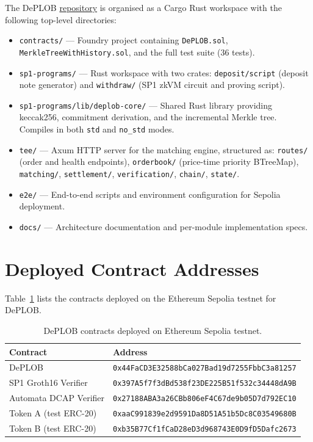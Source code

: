 \documentclass[12pt,a4paper]{article}
\begin{document}
The DePLOB \href{https://github.com/wr1159/deplob}{repository} is organised as a Cargo Rust workspace with the following top-level directories:

\begin{itemize}
    \item \texttt{contracts/} — Foundry project containing \texttt{DePLOB.sol}, \texttt{MerkleTreeWithHistory.sol}, and the full test suite (36 tests).
    \item \texttt{sp1-programs/} — Rust workspace with two crates: \texttt{deposit/script} (deposit note generator) and \texttt{withdraw/} (SP1 zkVM circuit and proving script).
    \item \texttt{sp1-programs/lib/deplob-core/} — Shared Rust library providing keccak256, commitment derivation, and the incremental Merkle tree. Compiles in both \texttt{std} and \texttt{no\_std} modes.
    \item \texttt{tee/} — Axum HTTP server for the matching engine, structured as: \texttt{routes/} (order and health endpoints), \texttt{orderbook/} (price-time priority BTreeMap), \texttt{matching/}, \texttt{settlement/}, \texttt{verification/}, \texttt{chain/}, \texttt{state/}.
    \item \texttt{e2e/} — End-to-end scripts and environment configuration for Sepolia deployment.
    \item \texttt{docs/} — Architecture documentation and per-module implementation specs.
\end{itemize}

\section{Deployed Contract Addresses}
\label{app:contracts}

Table~\ref{tab:contracts} lists the contracts deployed on the Ethereum Sepolia testnet for DePLOB.

\begin{table}[H]
\centering
\begin{tabular}{|l|l|}
\hline
\textbf{Contract} & \textbf{Address} \\
\hline
DePLOB & \texttt{0x44FaCD3E32588bCa027Bad19d7255FbbC3a81257} \\
\hline
SP1 Groth16 Verifier & \texttt{0x397A5f7f3dBd538f23DE225B51f532c34448dA9B} \\
\hline
Automata DCAP Verifier & \texttt{0x27188ABA3a26CBb806eF4C67de9b05D7d792EC10} \\
\hline
Token A (test ERC-20) & \texttt{0xaaC991839e2d9591Da8D51A51b5Dc8C03549680B} \\
\hline
Token B (test ERC-20) & \texttt{0xb35B77Cf1fCaD28eD3d968743E0D9fD5Dafc2673} \\
\hline
\end{tabular}
\caption{DePLOB contracts deployed on Ethereum Sepolia testnet.}
\label{tab:contracts}
\end{table}
\end{document}
